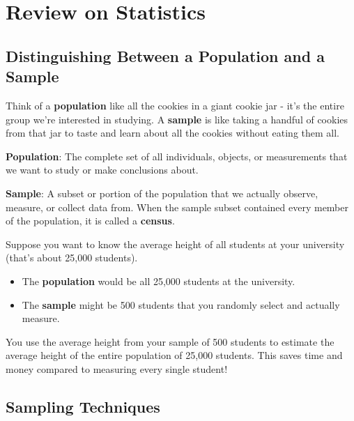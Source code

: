\chapter{Review on Statistics}

\section{Distinguishing Between a Population and a Sample}

Think of a \textbf{population} like all the cookies in a giant cookie jar - it's the entire group we're interested in studying. A \textbf{sample} is like taking a handful of cookies from that jar to taste and learn about all the cookies without eating them all.

\textbf{Population}: The complete set of all individuals, objects, or measurements that we want to study or make conclusions about.

\textbf{Sample}: A subset or portion of the population that we actually observe, measure, or collect data from.
When the sample subset contained every member of the population, it is called a \textbf{census}.

\begin{example}
Suppose you want to know the average height of all students at your university (that's about 25,000 students). 
\begin{itemize}
    \item[{\color{blue!55!white} \ding{104}}] The \textbf{population} would be all 25,000 students at the university.
    \item[{\color{blue!55!white} \ding{104}}] The \textbf{sample} might be 500 students that you randomly select and actually measure.
\end{itemize}
You use the average height from your sample of 500 students to estimate the average height of the entire population of 25,000 students. This saves time and money compared to measuring every single student!
\end{example}


\section{Sampling Techniques}

